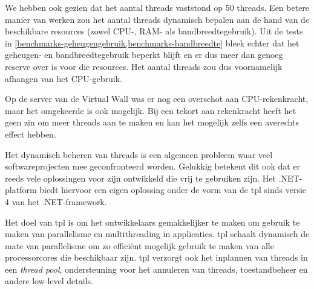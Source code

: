 We hebben ook gezien dat het aantal threads vaststond op 50 threads.
Een betere manier van werken zou het aantal threads dynamisch bepalen aan de hand van de beschikbare resources (zowel CPU-, RAM- als bandbreedtegebruik).
Uit de tests in \cref{benchmarks-geheugengebruik,benchmarks-bandbreedte} bleek echter dat het geheugen- en bandbreedtegebruik beperkt blijft
en er dus meer dan genoeg reserve over is voor die resources.
Het aantal threads zou dus voornamelijk afhangen van het CPU-gebruik.

Op de server van de Virtual Wall was er nog een overschot aan CPU-rekenkracht,
maar het omgekeerde is ook mogelijk.
Bij een tekort aan rekenkracht heeft het geen zin om meer threads aan te maken en kan het mogelijk zelfs een averechts effect hebben.

Het dynamisch beheren van threads is een algemeen probleem waar veel softwareprojecten mee geconfronteerd worden.
Gelukkig betekent dit ook dat er reeds vele oplossingen voor zijn ontwikkeld die vrij te gebruiken zijn.
Het .NET-platform biedt hiervoor een eigen oplossing onder de vorm van de \gls{tpl} sinds versie 4 van het .NET-framework.

Het doel van \gls{tpl} is om het ontwikkelaars gemakkelijker te maken om gebruik te maken van parallelisme en multithreading in applicaties.
\Gls{tpl} schaalt dynamisch de mate van parallelisme om zo efficiënt mogelijk gebruik te maken van alle processorcores die beschikbaar zijn.
\Gls{tpl} verzorgt ook het inplannen van threads in een \textit{thread pool}, ondersteuning voor het annuleren van threads, toestandbeheer en
andere low-level details\cite{msdn-tpl}.
